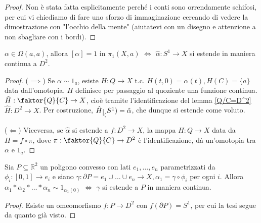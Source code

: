 \begin{proof}
  Non è stata fatta esplicitamente perché i conti sono orrendamente schifosi, per cui vi chiediamo di fare uno sforzo di immaginazione cercando di vedere la dimostrazione con "l'occhio della mente" (aiutatevi con un disegno e attenzione a non sbagliare con i bordi).
\end{proof}

\begin{prop}
  $\alpha \in \Omega(a, a)$, allora $[\alpha]=1$ in $\pi_1(X, a)$ $\Leftrightarrow$ $\hat{\alpha}: S^1 \rightarrow X$ si estende in maniera continua a $D^2$.
\end{prop}

\begin{proof}
  ($\implies$) Se $\alpha \sim 1_a$, esiste $H:Q \rightarrow X$ t.c. $H(t, 0)=\alpha(t), H(C)=\{a\}$ data dall'omotopia. $H$ definisce per passaggio al quoziente una funzione continua. $\hat{H}: \faktor{Q}{C} \rightarrow X$, cioè tramite l'identificazione del lemma \ref{Q/C=D^2} $\hat{H}: D^2 \rightarrow X$. Per costruzione,
  $\hat{H} \restrict(S^1)=\hat{\alpha}$, che dunque si estende come voluto.

  ($\Leftarrow$) Viceversa, se $\hat{\alpha}$ si estende a $f:D^2 \rightarrow X$, la mappa $H: Q \rightarrow X$ data da $H=f \circ \pi$, dove $\pi: \faktor{Q}{C} \rightarrow D^2$ è l'identificazione, dà un'omotopia tra $\alpha$ e $1_a$.
\end{proof}

\begin{cor}
  Sia $P \subseteq \mathbb{R}^2$ un poligono convesso con lati $e_1, \dots, e_n$ parametrizzati da $\phi_i: [0, 1] \rightarrow e_i$ e siano $\gamma: \partial P=e_1 \cup \dots \cup e_n \rightarrow X, \alpha_1=\gamma \circ \phi_i$ per ogni $i$. Allora
  $\alpha_1 * \alpha_2 * \dots * \alpha_n \sim 1_{\alpha_1(0)}$ $\Leftrightarrow$ $\gamma$ si estende a $P$ in maniera continua.
\end{cor}

\begin{proof}
  Esiste un omeomorfismo $f: P \rightarrow D^2$ con $f(\partial P)=S^1$, per cui la tesi segue da quanto già visto.
\end{proof}
